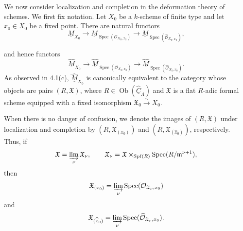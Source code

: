 
We now consider localization and completion in the deformation theory
of schemes. We first fix notation. Let $X_0$ be a $k$-scheme of finite
type and let $x_0\in X_0$ be a fixed point. There are natural functors
\[
\underline M_{X_0}
\longrightarrow
\underline M_{\operatorname{Spec}(\mathcal O_{X_0,x_0})}
\longrightarrow
\underline M_{\operatorname{Spec}(\widehat{\mathcal O}_{X_0,x_0})},
\]


and hence functors
\[
\widehat{\underline M}_{X_0}
\longrightarrow
\widehat{\underline M}_{\operatorname{Spec}(\mathcal O_{X_0,x_0})}
\longrightarrow
\widehat{\underline M}_{\operatorname{Spec}
 (\widehat{\mathcal O}_{X_0,x_0})}.
\]
As observed in 4.1(c), $\widehat{\underline M}_{X_0}$ is canonically
equivalent to the category whose objects are pairs $(R,\mathfrak X)$,
where $R\in\operatorname{Ob}(\widehat{\underline C}_\Lambda)$ and
$\mathfrak X$ is a flat $R$-adic formal scheme equipped with a fixed
isomorphism $\mathfrak X_0\xrightarrow{\sim}X_0$.

When there is no danger of confusion, we denote the images of
$(R,\mathfrak X)$ under localization and completion by
$(R,\mathfrak X_{(x_0)})$ and
$(R,\mathfrak X_{(\widehat{x}_0)})$, respectively. Thus, if
\[
\mathfrak X=\varinjlim_\nu\mathfrak X_\nu,
\qquad
\mathfrak X_\nu
=\mathfrak X\times_{\operatorname{Spf}(R)}
 \operatorname{Spec}(R/\mathfrak m^{\nu+1}),
\]
then
\[
\mathfrak X_{(x_0)}
=\varinjlim_\nu
 \operatorname{Spec}(\mathcal O_{\mathfrak X_\nu,x_0})
\]
and
\[
\mathfrak X_{(\widehat{x}_0)}
=\varinjlim_\nu
 \operatorname{Spec}(\widehat{\mathcal O}_{\mathfrak X_\nu,x_0}).
\]
